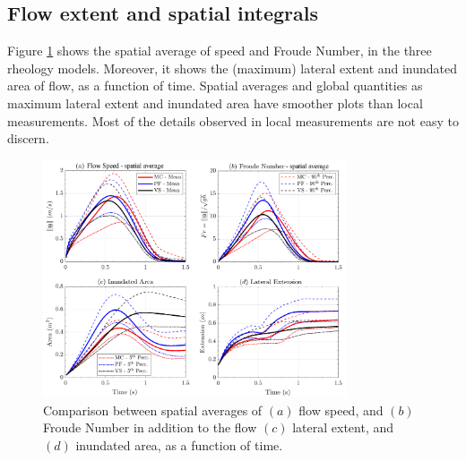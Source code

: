 \documentclass{article}
\begin{document}
\subsection{Flow extent and spatial integrals}
Figure \ref{fig:Ramp-spatial} shows the spatial average of speed and Froude Number, in the three rheology models. Moreover, it shows the (maximum) lateral extent and inundated area of flow, as a function of time. Spatial averages and global quantities as maximum lateral extent and inundated area have smoother plots than local measurements. Most of the details observed in local measurements are not easy to discern.
\begin{figure}[H]
        \centering
        \includegraphics[width=0.8\textwidth]{InclinedPlane/AveragedMeasurments/Averaged_MeasuresIncline.png}
        \caption{Comparison between spatial averages of $(a)$ flow speed, and $(b)$ Froude Number in addition to the flow $(c)$ lateral extent, and $(d)$ inundated area, as a function of time.}
        \label{fig:Ramp-spatial}
\end{figure}
\end{document}

